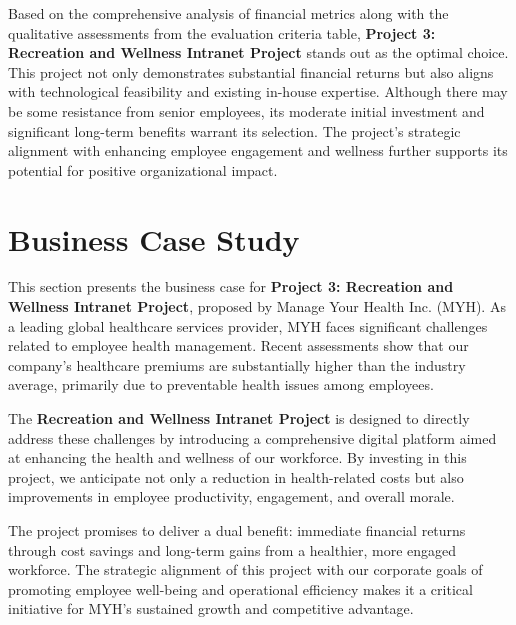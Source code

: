 Based on the comprehensive analysis of financial metrics along with the qualitative assessments from the evaluation criteria table, \textbf{Project 3: Recreation and Wellness Intranet Project} stands out as the optimal choice. This project not only demonstrates substantial financial returns but also aligns with technological feasibility and existing in-house expertise. Although there may be some resistance from senior employees, its moderate initial investment and significant long-term benefits warrant its selection. The project's strategic alignment with enhancing employee engagement and wellness further supports its potential for positive organizational impact.


\section{Business Case Study}
This section presents the business case for \textbf{Project 3: Recreation and Wellness Intranet Project}, proposed by Manage Your Health Inc. (MYH). As a leading global healthcare services provider, MYH faces significant challenges related to employee health management. Recent assessments show that our company's healthcare premiums are substantially higher than the industry average, primarily due to preventable health issues among employees.

The \textbf{Recreation and Wellness Intranet Project} is designed to directly address these challenges by introducing a comprehensive digital platform aimed at enhancing the health and wellness of our workforce. By investing in this project, we anticipate not only a reduction in health-related costs but also improvements in employee productivity, engagement, and overall morale.

The project promises to deliver a dual benefit: immediate financial returns through cost savings and long-term gains from a healthier, more engaged workforce. The strategic alignment of this project with our corporate goals of promoting employee well-being and operational efficiency makes it a critical initiative for MYH's sustained growth and competitive advantage.

